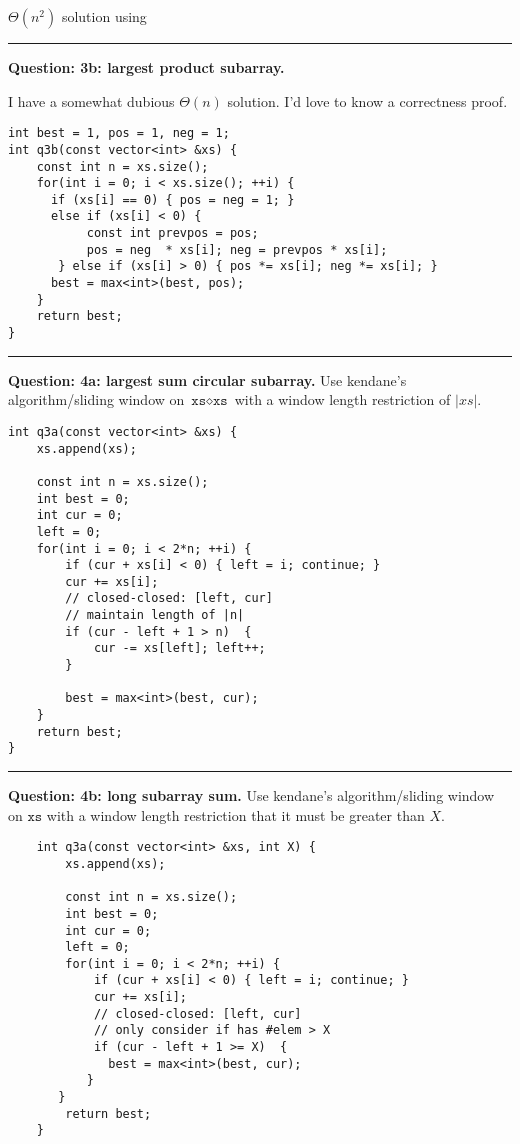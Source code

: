 \documentclass[14pt]{report}
\newcommand*{\question}[1]{\leavevmode\clearpage \par\noindent\rule{\textwidth}{0.4pt} \textbf{Question: #1.}}
\begin{document}
$\Theta(n^2)$ solution using

\question{3b: largest product subarray}

I have a somewhat dubious $\Theta(n)$ solution. I'd love to know
a correctness proof.

\begin{verbatim}
int best = 1, pos = 1, neg = 1;
int q3b(const vector<int> &xs) {
    const int n = xs.size();
    for(int i = 0; i < xs.size(); ++i) {
      if (xs[i] == 0) { pos = neg = 1; }
      else if (xs[i] < 0) {
           const int prevpos = pos;
           pos = neg  * xs[i]; neg = prevpos * xs[i];
       } else if (xs[i] > 0) { pos *= xs[i]; neg *= xs[i]; }
      best = max<int>(best, pos);
    }
    return best;
}
\end{verbatim}

\question{4a: largest sum circular subarray}
Use kendane's algorithm/sliding window on $\texttt{xs} \diamond \texttt{xs}$
with a window length restriction of $|xs|$.

\begin{verbatim}
int q3a(const vector<int> &xs) {
    xs.append(xs);

    const int n = xs.size();
    int best = 0;
    int cur = 0;
    left = 0;
    for(int i = 0; i < 2*n; ++i) {
        if (cur + xs[i] < 0) { left = i; continue; }
        cur += xs[i];
        // closed-closed: [left, cur]
        // maintain length of |n|
        if (cur - left + 1 > n)  {
            cur -= xs[left]; left++;
        }

        best = max<int>(best, cur);
    }
    return best;
}
\end{verbatim}

\question{4b: long subarray sum}
Use kendane's algorithm/sliding window on $\texttt{xs}$
with a window length restriction that it must be greater than $X$.

\begin{verbatim}
    int q3a(const vector<int> &xs, int X) {
        xs.append(xs);

        const int n = xs.size();
        int best = 0;
        int cur = 0;
        left = 0;
        for(int i = 0; i < 2*n; ++i) {
            if (cur + xs[i] < 0) { left = i; continue; }
            cur += xs[i];
            // closed-closed: [left, cur]
            // only consider if has #elem > X
            if (cur - left + 1 >= X)  {
              best = max<int>(best, cur);
           }
       }
        return best;
    }
\end{verbatim}
\end{document}
